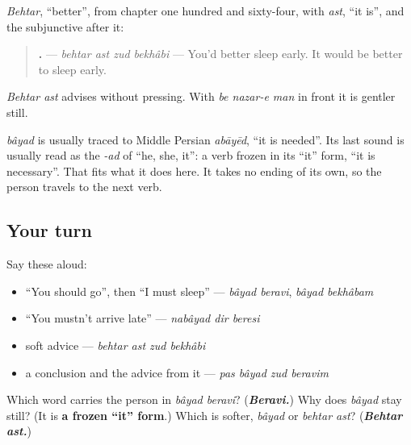 \begin{grammarlens}[title={Grammar Lens: behtar ast, the softer one}]
\emph{Behtar}, \textquotedblleft{}better\textquotedblright{}, from chapter one hundred and sixty-four, with \emph{ast}, \textquotedblleft{}it is\textquotedblright{}, and the subjunctive after it:

\begin{quote}
\textbf{   .} — \emph{behtar ast zud bekhâbi} — You'd better sleep early. It would be better to sleep early.
\end{quote}

\emph{Behtar ast} advises without pressing. With \emph{be nazar-e man} in front it is gentler still.
\end{grammarlens}

\begin{cousinweb}
\emph{bâyad} is usually traced to Middle Persian \emph{abāyēd}, \textquotedblleft{}it is needed\textquotedblright{}. Its last sound is usually read as the \emph{-ad} of \textquotedblleft{}he, she, it\textquotedblright{}: a verb frozen in its \textquotedblleft{}it\textquotedblright{} form, \textquotedblleft{}it is necessary\textquotedblright{}. That fits what it does here. It takes no ending of its own, so the person travels to the next verb.
\end{cousinweb}

\subsection*{Your turn}
Say these aloud:

\begin{itemize}
\raggedright
  \item \textquotedblleft{}You should go\textquotedblright{}, then \textquotedblleft{}I must sleep\textquotedblright{} — \emph{bâyad beravi}, \emph{bâyad bekhâbam}
  \item \textquotedblleft{}You mustn't arrive late\textquotedblright{} — \emph{nabâyad dir beresi}
  \item soft advice — \emph{behtar ast zud bekhâbi}
  \item a conclusion and the advice from it — \emph{pas bâyad zud beravim}
\end{itemize}

\begin{tcolorbox}[breakable,colback=teal!4,colframe=teal!35!black,title={Before you move on}]
Which word carries the person in \emph{bâyad beravi}? (\emph{\textbf{Beravi.}}) Why does \emph{bâyad} stay still? (It is \textbf{a frozen \textquotedblleft{}it\textquotedblright{} form}.) Which is softer, \emph{bâyad} or \emph{behtar ast}? (\emph{\textbf{Behtar ast.}})
\end{tcolorbox}
